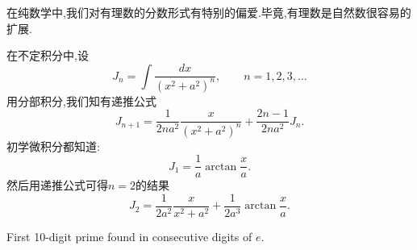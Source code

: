 
在纯数学中,我们对有理数的分数形式有特别的偏爱.毕竟,有理数是自然数很容易的扩展.


在不定积分中,设
$$J_n = \int\frac{dx}{(x^2+a^2)^n}, \qquad n = 1, 2, 3, \dots $$
用分部积分,我们知有递推公式\cite{FeiH2}
$$J_{n+1} =\frac{1}{2na^2} \frac{x}{(x^2+a^2)^n} + \frac{2n-1}{2na^2}J_n.$$
初学微积分都知道:
$$J_1=\frac{1}{a}\arctan\frac{x}{a}.$$
然后用递推公式可得$n = 2$的结果
$$J_2 = \frac{1}{2a^2}\frac{x}{x^2+a^2} + \frac{1}{2a^3}\arctan\frac{x}{a}.$$

First 10-digit prime found in consecutive digits of $e$.
